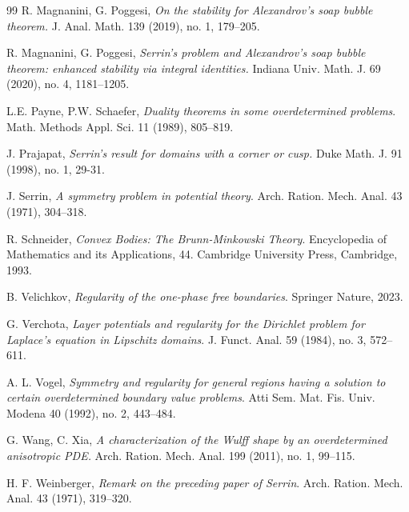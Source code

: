 \documentclass[reqno,11pt]{amsart}
\numberwithin{equation}{section}
\theoremstyle{remark}
\begin{document}
\begin{thebibliography}{99}
R. Magnanini, G. Poggesi, 
\emph{On the stability for Alexandrov's soap bubble theorem. }
J. Anal. Math. 139 (2019), no. 1, 179--205.

R. Magnanini, G. Poggesi, 
\emph{Serrin's problem and Alexandrov's soap bubble theorem: enhanced stability via integral identities.}
Indiana Univ. Math. J. 69 (2020), no. 4, 1181--1205.

L.E. Payne, P.W. Schaefer, \emph{Duality theorems in some overdetermined problems}. Math. Methods Appl. Sci. 11 (1989), 805--819.

J. Prajapat, 
\emph{Serrin's result for domains with a corner or cusp.}
Duke Math. J. 91 (1998), no. 1, 29-31.

J. Serrin, \emph{A symmetry problem in potential theory}. Arch. Ration. Mech. Anal. 43 (1971), 304--318.

R. Schneider, \emph{Convex Bodies: The Brunn-Minkowski Theory}. Encyclopedia of Mathematics and its Applications, 44. Cambridge University Press, Cambridge, 1993.

B. Velichkov, \emph{Regularity of the one-phase free boundaries}. Springer Nature, 2023.

G. Verchota, 
\emph{Layer potentials and regularity for the Dirichlet problem for Laplace's equation in Lipschitz domains}.
J. Funct. Anal. 59 (1984), no. 3, 572--611.

A. L. Vogel, \emph{Symmetry and regularity for general regions having a solution to certain overdetermined boundary value problems}. Atti Sem. Mat. Fis. Univ. Modena 40 (1992), no. 2, 443--484. 

G. Wang, C. Xia, 
\emph{A characterization of the Wulff shape by an overdetermined anisotropic PDE.}
Arch. Ration. Mech. Anal. 199 (2011), no. 1, 99--115.

H. F. Weinberger, \emph{Remark on the preceding paper of Serrin}. Arch. Ration. Mech. Anal.
43 (1971), 319--320.

\end{thebibliography}
\end{document}
